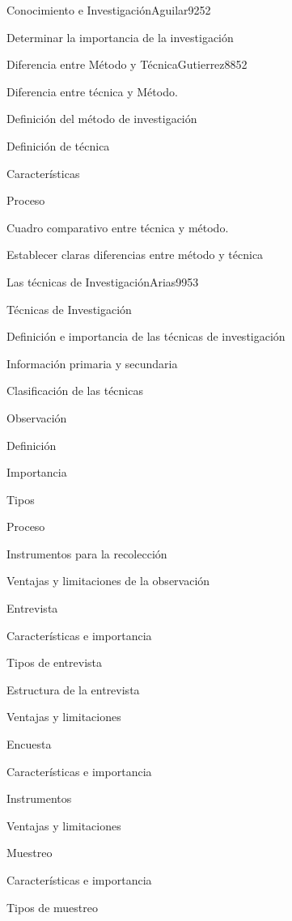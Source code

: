 \begin{syllabus}
\begin{unit}{Conocimiento e Investigación}{Aguilar92}{5}{2}
   \begin{unitgoals}
      \item Determinar la importancia de la investigación
   \end{unitgoals}
\end{unit}

\begin{unit}{Diferencia entre Método y Técnica}{Gutierrez88}{5}{2}
   \begin{topics}
      \item Diferencia entre técnica y Método.
	\item Definición del método de investigación
	\item Definición de técnica
	\item Características
	\item Proceso
	\item Cuadro comparativo entre técnica y método.
   \end{topics}

   \begin{unitgoals}
      \item Establecer claras diferencias entre método y técnica
   \end{unitgoals}
\end{unit}

\begin{unit}{Las técnicas de Investigación}{Arias99}{5}{3}
   \begin{topics}
      \item Técnicas de Investigación
	\item Definición e importancia de las técnicas de investigación
	\item Información primaria y secundaria
	\item Clasificación de las técnicas
	\item Observación
	\item Definición
	\item Importancia
	\item Tipos
	\item Proceso
	\item Instrumentos para la recolección 
	\item Ventajas y limitaciones de la observación
	\item Entrevista
	\item Características e importancia
	\item Tipos de entrevista
	\item Estructura de la entrevista
	\item Ventajas y limitaciones
	\item Encuesta
	\item Características e importancia
	\item Instrumentos
	\item Ventajas y limitaciones
	\item Muestreo
	\item Características e importancia
	\item Tipos de muestreo
   \end{topics}


\end{unit}
\end{syllabus}
